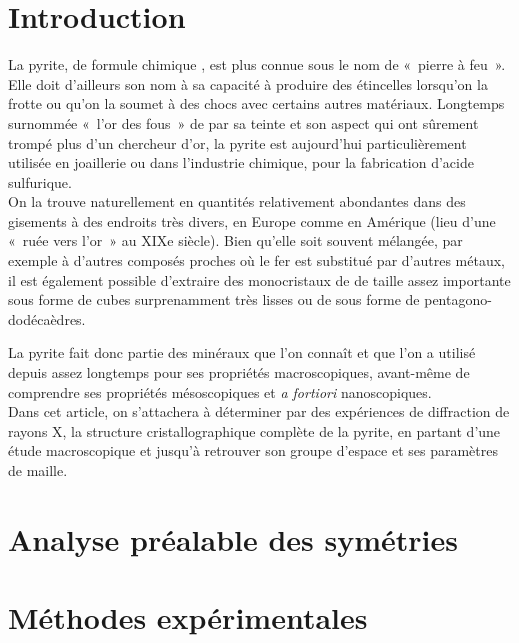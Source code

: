 \section{Introduction}

La pyrite, de formule chimique , est plus connue sous le nom de «~pierre à feu~». Elle doit d'ailleurs son nom à sa capacité à produire des étincelles lorsqu'on la frotte ou qu'on la soumet à des chocs avec certains autres matériaux. Longtemps surnommée «~l'or des fous~» de par sa teinte et son aspect qui ont sûrement trompé plus d'un chercheur d'or, la pyrite est aujourd'hui particulièrement utilisée en joaillerie ou dans l'industrie chimique, pour la fabrication d'acide sulfurique. \\
On la trouve naturellement en quantités relativement abondantes dans des gisements à des endroits très divers, en Europe comme en Amérique (lieu d'une «~ruée vers l'or~» au XIXe siècle). Bien qu'elle soit souvent mélangée, par exemple à d'autres composés proches où le fer est substitué par d'autres métaux, il est également possible d'extraire des monocristaux de  de taille assez importante sous forme de cubes surprenamment très lisses ou de sous forme de pentagono-dodécaèdres.

La pyrite fait donc partie des minéraux que l'on connaît et que l'on a utilisé depuis assez longtemps pour ses propriétés macroscopiques, avant-même de comprendre ses propriétés mésoscopiques et \textit{a fortiori} nanoscopiques.\\
Dans cet article, on s'attachera à déterminer par des expériences de diffraction de rayons X, la structure cristallographique complète de la pyrite, en partant d'une étude macroscopique et jusqu'à retrouver son groupe d'espace et ses paramètres de maille.

\section{Analyse préalable des symétries}


\section{Méthodes expérimentales}

